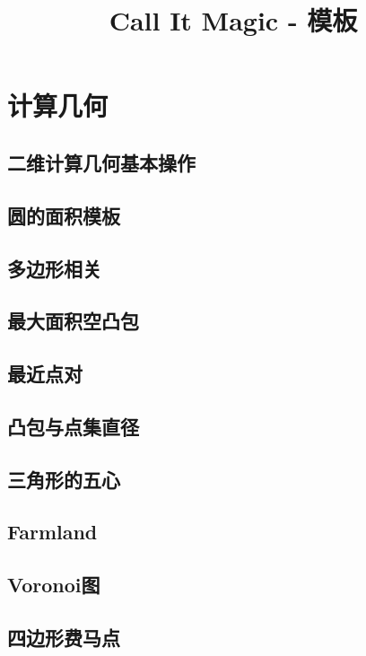 \documentclass[10pt]{article}
\begin{document}
\title{Call It Magic - 模板}
\date{}
\tableofcontents
\newpage

\section{计算几何}

	\subsection{二维计算几何基本操作}

	\subsection{圆的面积模板}

	\subsection{多边形相关}

	\subsection{最大面积空凸包}

	\subsection{最近点对}

	\subsection{凸包与点集直径}

	\subsection{三角形的五心}
		
	\subsection{Farmland}

	\subsection{Voronoi图}

	\subsection{四边形费马点}
\end{document}
